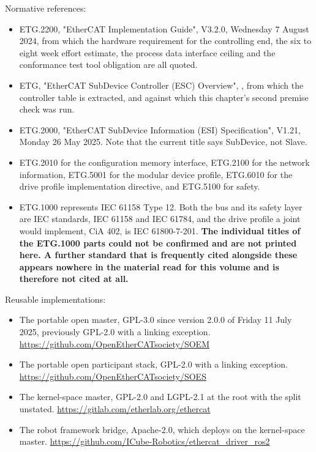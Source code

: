 Normative references:
\begin{itemize}
\item ETG.2200, "EtherCAT Implementation Guide", V3.2.0, Wednesday 7 August
2024, from which the hardware requirement for the controlling end, the six to
eight week effort estimate, the process data interface ceiling and the
conformance test tool obligation are all quoted.
\item ETG, "EtherCAT SubDevice Controller (ESC) Overview", , from which
the controller table is extracted, and against which this chapter's second
premise check was run.
\item ETG.2000, "EtherCAT SubDevice Information (ESI) Specification", V1.21,
Monday 26 May 2025. Note that the current title says SubDevice, not Slave.
\item ETG.2010 for the configuration memory interface, ETG.2100 for the network
information, ETG.5001 for the modular device profile, ETG.6010 for the drive
profile implementation directive, and ETG.5100 for safety.
\item ETG.1000 represents IEC 61158 Type 12. Both the bus and its safety layer
are IEC standards, IEC 61158 and IEC 61784, and the drive profile a joint would
implement, CiA 402, is IEC 61800-7-201. \textbf{The individual titles of the
ETG.1000 parts could not be confirmed and are not printed here. A further
standard that is frequently cited alongside these appears nowhere in the
material read for this volume and is therefore not cited at all.}
\end{itemize}

Reusable implementations:
\begin{itemize}
\item The portable open master, GPL-3.0 since version 2.0.0 of Friday 11 July
2025, previously GPL-2.0 with a linking exception.\newline
\url{https://github.com/OpenEtherCATsociety/SOEM}
\item The portable open participant stack, GPL-2.0 with a linking
exception.\newline
\url{https://github.com/OpenEtherCATsociety/SOES}
\item The kernel-space master, GPL-2.0 and LGPL-2.1 at the root with the split
unstated.\newline
\url{https://gitlab.com/etherlab.org/ethercat}
\item The robot framework bridge, Apache-2.0, which deploys on the kernel-space
master.\newline
\url{https://github.com/ICube-Robotics/ethercat_driver_ros2}
\end{itemize}
